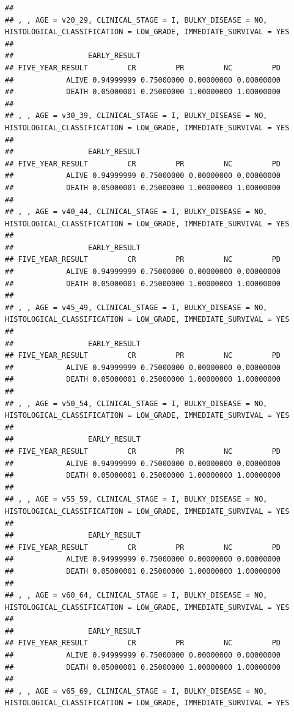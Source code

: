 \documentclass[]{article}
\begin{document}
\begin{verbatim}
## 
## , , AGE = v20_29, CLINICAL_STAGE = I, BULKY_DISEASE = NO, HISTOLOGICAL_CLASSIFICATION = LOW_GRADE, IMMEDIATE_SURVIVAL = YES
## 
##                 EARLY_RESULT
## FIVE_YEAR_RESULT         CR         PR         NC         PD
##            ALIVE 0.94999999 0.75000000 0.00000000 0.00000000
##            DEATH 0.05000001 0.25000000 1.00000000 1.00000000
## 
## , , AGE = v30_39, CLINICAL_STAGE = I, BULKY_DISEASE = NO, HISTOLOGICAL_CLASSIFICATION = LOW_GRADE, IMMEDIATE_SURVIVAL = YES
## 
##                 EARLY_RESULT
## FIVE_YEAR_RESULT         CR         PR         NC         PD
##            ALIVE 0.94999999 0.75000000 0.00000000 0.00000000
##            DEATH 0.05000001 0.25000000 1.00000000 1.00000000
## 
## , , AGE = v40_44, CLINICAL_STAGE = I, BULKY_DISEASE = NO, HISTOLOGICAL_CLASSIFICATION = LOW_GRADE, IMMEDIATE_SURVIVAL = YES
## 
##                 EARLY_RESULT
## FIVE_YEAR_RESULT         CR         PR         NC         PD
##            ALIVE 0.94999999 0.75000000 0.00000000 0.00000000
##            DEATH 0.05000001 0.25000000 1.00000000 1.00000000
## 
## , , AGE = v45_49, CLINICAL_STAGE = I, BULKY_DISEASE = NO, HISTOLOGICAL_CLASSIFICATION = LOW_GRADE, IMMEDIATE_SURVIVAL = YES
## 
##                 EARLY_RESULT
## FIVE_YEAR_RESULT         CR         PR         NC         PD
##            ALIVE 0.94999999 0.75000000 0.00000000 0.00000000
##            DEATH 0.05000001 0.25000000 1.00000000 1.00000000
## 
## , , AGE = v50_54, CLINICAL_STAGE = I, BULKY_DISEASE = NO, HISTOLOGICAL_CLASSIFICATION = LOW_GRADE, IMMEDIATE_SURVIVAL = YES
## 
##                 EARLY_RESULT
## FIVE_YEAR_RESULT         CR         PR         NC         PD
##            ALIVE 0.94999999 0.75000000 0.00000000 0.00000000
##            DEATH 0.05000001 0.25000000 1.00000000 1.00000000
## 
## , , AGE = v55_59, CLINICAL_STAGE = I, BULKY_DISEASE = NO, HISTOLOGICAL_CLASSIFICATION = LOW_GRADE, IMMEDIATE_SURVIVAL = YES
## 
##                 EARLY_RESULT
## FIVE_YEAR_RESULT         CR         PR         NC         PD
##            ALIVE 0.94999999 0.75000000 0.00000000 0.00000000
##            DEATH 0.05000001 0.25000000 1.00000000 1.00000000
## 
## , , AGE = v60_64, CLINICAL_STAGE = I, BULKY_DISEASE = NO, HISTOLOGICAL_CLASSIFICATION = LOW_GRADE, IMMEDIATE_SURVIVAL = YES
## 
##                 EARLY_RESULT
## FIVE_YEAR_RESULT         CR         PR         NC         PD
##            ALIVE 0.94999999 0.75000000 0.00000000 0.00000000
##            DEATH 0.05000001 0.25000000 1.00000000 1.00000000
## 
## , , AGE = v65_69, CLINICAL_STAGE = I, BULKY_DISEASE = NO, HISTOLOGICAL_CLASSIFICATION = LOW_GRADE, IMMEDIATE_SURVIVAL = YES

\end{verbatim}
\end{document}
